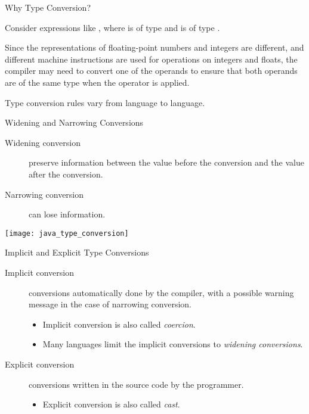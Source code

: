 \begin{bibunit}[apalike]
\begin{frame}{Why Type Conversion?}
	\begin{description}
	\item Consider expressions like , where  is of type  and  is of type .
	\item Since the representations of floating-point numbers and integers are different, and different machine instructions are used for operations on integers and floats, the compiler may need to convert one of the operands to ensure that both operands are of the same type when the operator is applied.
			\begin{tac}[.5\linewidth]
			\end{tac}
	\vspace{2em}
	\item[Note] Type conversion rules vary from language to language.
	\end{description}
\end{frame}

\begin{frame}{Widening and Narrowing Conversions}
	\begin{description}
	\item[Widening conversion] preserve information between the value before the conversion and the value after the conversion.
	\item[Narrowing conversion] can lose information.
	\end{description}
	\begin{center}
		\texttt{[image: java\_type\_conversion]}
	\end{center}
\end{frame}

\begin{frame}{Implicit and Explicit Type Conversions}
	\begin{description}
	\item[Implicit conversion] conversions automatically done by the compiler, with a possible warning message in the case of narrowing conversion.
		\begin{itemize}
		\item Implicit conversion is also called \emph{coercion}.
		\item Many languages limit the implicit conversions to \emph{widening conversions}.
		\end{itemize}
	\vfill
	\item[Explicit conversion] conversions written in the source code by the programmer.
		\begin{itemize}
		\item Explicit conversion is also called \emph{cast}.
		\end{itemize}
	\end{description}
\end{frame}


\end{bibunit}
